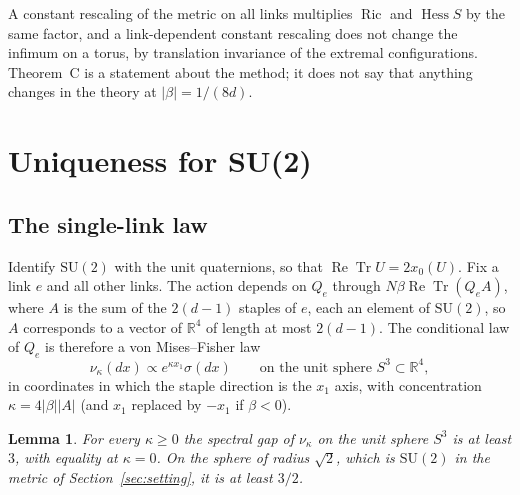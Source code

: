 \documentclass[11pt]{amsart}
\newtheorem{lemma}[theorem]{Lemma}
\theoremstyle{definition}
\theoremstyle{remark}
\newcommand{\R}{\mathbb{R}}
\newcommand{\SU}{\mathrm{SU}}
\newcommand{\ReTr}{\operatorname{Re}\operatorname{Tr}}
\newcommand{\Hess}{\operatorname{Hess}}
\newcommand{\Ric}{\operatorname{Ric}}
\begin{document}
A constant rescaling of the metric on all links multiplies $\Ric$ and $\Hess
S$ by the same factor, and a link-dependent constant rescaling does not change
the infimum on a torus, by translation invariance of the extremal
configurations. Theorem~C is a statement about the method; it does not say
that anything changes in the theory at $|\beta|=1/(8d)$.

\section{Uniqueness for SU(2)}\label{sec:su2}

\subsection{The single-link law}

Identify $\SU(2)$ with the unit quaternions, so that $\ReTr U=2x_0(U)$. Fix a
link $e$ and all other links. The action depends on $Q_e$ through
$N\beta\ReTr(Q_eA)$, where $A$ is the sum of the $2(d-1)$ staples of $e$, each
an element of $\SU(2)$, so $A$ corresponds to a vector of $\R^4$ of length at
most $2(d-1)$. The conditional law of $Q_e$ is therefore a von Mises--Fisher law
\[
\nu_\kappa(dx)\propto e^{\kappa x_1}\sigma(dx)\qquad\text{on the unit sphere }
S^3\subset\R^4,
\]
in coordinates in which the staple direction is the $x_1$ axis, with
concentration $\kappa=4|\beta||A|$ (and $x_1$ replaced by $-x_1$ if
$\beta<0$).

\begin{lemma}\label{lem:vmf}
For every $\kappa\ge0$ the spectral gap of $\nu_\kappa$ on the unit sphere $S^3$
is at least $3$, with equality at $\kappa=0$. On the sphere of radius
$\sqrt2$, which is $\SU(2)$ in the metric of Section~\ref{sec:setting}, it is at
least $3/2$.
\end{lemma}
\end{document}
